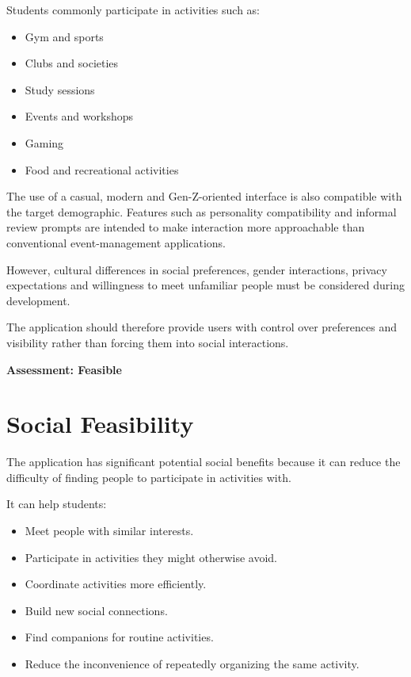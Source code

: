 \documentclass{tietreport}
\begin{document}
Students commonly participate in activities such as:

\begin{itemize}[nosep]
  \item Gym and sports
  \item Clubs and societies
  \item Study sessions
  \item Events and workshops
  \item Gaming
  \item Food and recreational activities
\end{itemize}

The use of a casual, modern and Gen-Z-oriented interface is also compatible with the
target demographic. Features such as personality compatibility and informal review
prompts are intended to make interaction more approachable than conventional
event-management applications.

However, cultural differences in social preferences, gender interactions, privacy
expectations and willingness to meet unfamiliar people must be considered during
development.

The application should therefore provide users with control over preferences and
visibility rather than forcing them into social interactions.

\noindent\textbf{Assessment: Feasible}

\section{Social Feasibility}

The application has significant potential social benefits because it can reduce the
difficulty of finding people to participate in activities with.

It can help students:

\begin{itemize}[nosep]
  \item Meet people with similar interests.
  \item Participate in activities they might otherwise avoid.
  \item Coordinate activities more efficiently.
  \item Build new social connections.
  \item Find companions for routine activities.
  \item Reduce the inconvenience of repeatedly organizing the same activity.
\end{itemize}
\end{document}
